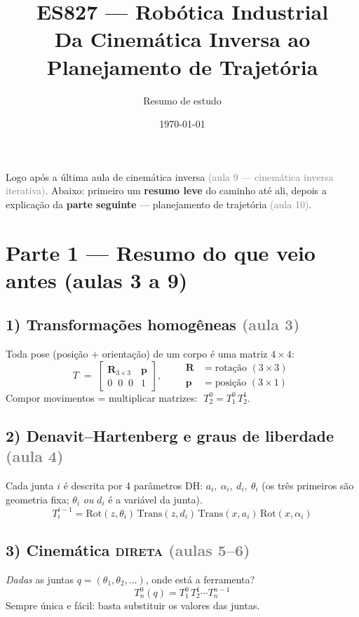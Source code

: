 \documentclass[11pt,a4paper]{article}
\title{\textbf{ES827 — Robótica Industrial}\\[2pt]
       \large Da Cinemática Inversa ao Planejamento de Trajetória}
\author{Resumo de estudo}
\date{\today}
\newcommand{\aula}[1]{{\small\textcolor{gray}{(#1)}}}
\begin{document}
\maketitle

\begin{tcolorbox}[colback=gray!8,colframe=gray!40,title=Onde você parou]
Logo após a última aula de cinemática inversa \aula{aula 9 — cinemática inversa
iterativa}. Abaixo: primeiro um \textbf{resumo leve} do caminho até ali, depois
a explicação da \textbf{parte seguinte} — planejamento de trajetória \aula{aula 10}.
\end{tcolorbox}

\section*{\textcolor{laranja}{Parte 1 — Resumo do que veio antes (aulas 3 a 9)}}

\subsection*{1) Transformações homogêneas \aula{aula 3}}
Toda pose (posição + orientação) de um corpo é uma matriz $4\times4$:
\[
T \;=\;
\begin{bmatrix} \bm{R}_{3\times3} & \bm{p} \\[2pt] 0\;\;0\;\;0 & 1 \end{bmatrix},
\qquad
\begin{aligned}
\bm{R} &= \text{rotação }(3\times3)\\
\bm{p} &= \text{posição }(3\times1)
\end{aligned}
\]
Compor movimentos = multiplicar matrizes: $\;T^{0}_{2} = T^{0}_{1}\,T^{1}_{2}$.

\subsection*{2) Denavit--Hartenberg e graus de liberdade \aula{aula 4}}
Cada junta $i$ é descrita por 4 parâmetros DH: $a_i,\ \alpha_i,\ d_i,\ \theta_i$
(os três primeiros são geometria fixa; $\theta_i$ \emph{ou} $d_i$ é a variável da junta).
\[
T^{i-1}_{i} = \mathrm{Rot}(z,\theta_i)\,\mathrm{Trans}(z,d_i)\,
              \mathrm{Trans}(x,a_i)\,\mathrm{Rot}(x,\alpha_i)
\]

\subsection*{3) Cinemática \textsc{direta} \aula{aulas 5--6}}
\emph{Dadas} as juntas $q=(\theta_1,\theta_2,\dots)$, onde está a ferramenta?
\[
T^{0}_{n}(q) = T^{0}_{1}\,T^{1}_{2}\cdots T^{n-1}_{n}
\]
Sempre única e fácil: basta substituir os valores das juntas.
\end{document}
